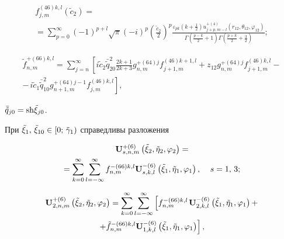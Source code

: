 \begin{theorem}
\begin{multline}\label{eq:1:82}
f_{j,m}^{(46)k,l}({\tilde c_2}) = \\
= \sum\limits_{p = 0}^\infty  {{{( - 1)}^{p + l}}} \sqrt \pi  {( - i)^p}{\left( {\frac{{{{\tilde c}_2}}}{2}} \right)^p}\frac{{{\varepsilon _{pk}}\left( {k + \frac{1}{2}} \right)u_{j + p,m - l}^{ + (4)}\left( {{r_{12}},{\theta _{12}},{\varphi _{12}}} \right)}}{{\Gamma \left( {\frac{{p - k}}{2} + 1} \right)\Gamma \left( {\frac{{p + k}}{2} + \frac{3}{2}} \right)}};
\end{multline}

\begin{multline}\label{eq:1:83}
\tilde f_{n,m}^{ + (66)k,l} = \sum\limits_{j = n}^\infty  {\left[ {i{{\tilde c}_2}\bar{\tilde q}_{20}^2\frac{{2k + 1}}{{2k + 3}}} \right.} g_{n,m}^{ + (64)j}f_{j + 1,m}^{(46)k + 1,l} + {z_{12}}g_{n,m}^{ + (64)j}f_{j + 1,m}^{(46)k,l} - \\
- \left. {\frac{{}}{{}}i{{\tilde c}_1}\bar{\tilde q}_{10}^2g_{n + 1,m}^{ + (64)j - 1}f_{j,m}^{(46)k,l}} \right],
\end{multline}

\noindent ${\bar{\tilde q}_{j0}} = {\mathop{\rm sh}\nolimits} {\tilde \xi _{j0}}$.

При ${\tilde \xi _1},{\mkern 1mu} {\kern 1pt} {\tilde \xi _{10}} \in \left[ {0;{\mkern 1mu} {\kern 1pt} {{\tilde \gamma }_1}} \right)$ справедливы разложения

\begin{multline}\label{eq:1:84}
{\bf{U}}_{s,n,m}^{ + (6)}\left( {{{\tilde \xi }_2},{{\tilde \eta }_2},{\varphi _2}} \right) = \\
= \sum\limits_{k = 0}^\infty  {\sum\limits_{l =  - \infty }^\infty  {f_{n,m}^{ - (66)k,l}} } {\bf{U}}_{s,k,l}^{ - (6)}\left( {{{\tilde \xi }_1},{{\tilde \eta }_1},{\varphi _1}} \right), \quad {\kern 1pt} s = 1,{\mkern 1mu} {\kern 1pt} 3;
\end{multline}

\begin{multline}\label{eq:1:85}
{\bf{U}}_{2,n,m}^{ + (6)}\left( {{{\tilde \xi }_2},{{\tilde \eta }_2},{\varphi _2}} \right) = \sum\limits_{k = 0}^\infty  {\sum\limits_{l =  - \infty }^\infty  {\left[ {f_{n,m}^{ - (66)k,l}} \right.} } {\bf{U}}_{2,k,l}^{ - (6)}\left( {{{\tilde \xi }_1},{{\tilde \eta }_1},{\varphi _1}} \right) + \\
\left. { + \tilde f_{n,m}^{ - (66)k,l}{\bf{U}}_{1,k,l}^{ - (6)}\left( {{{\tilde \xi }_1},{{\tilde \eta }_1},{\varphi _1}} \right)} \right],
\end{multline}


\end{theorem}
